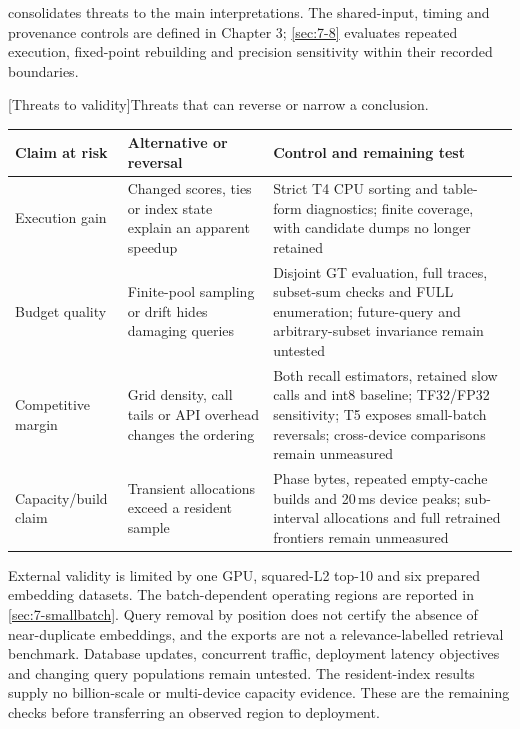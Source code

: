 consolidates threats to the main interpretations.
The shared-input, timing and provenance controls are defined in Chapter 3;
\cref{sec:7-8} evaluates repeated execution, fixed-point rebuilding and
precision sensitivity within their recorded boundaries.


\par\medskip\noindent\begin{minipage}{\linewidth}
\centering\captionsetup{hypcap=false}
[Threats to validity]{Threats that can reverse or narrow a conclusion.}
\label{tab:8-threats}
\footnotesize\setlength{\tabcolsep}{4pt}
\begin{tabularx}{\linewidth}{@{}*{3}{>{\raggedright\arraybackslash}X}@{}}
\toprule
Claim at risk & Alternative or reversal & Control and remaining test \\
\midrule
Execution gain & Changed scores, ties or index state explain an apparent
speedup & Strict T4 CPU sorting and table-form diagnostics; finite
coverage, with candidate dumps no longer retained \\
Budget quality & Finite-pool sampling or drift hides damaging queries
& Disjoint GT evaluation, full traces, subset-sum checks and FULL
enumeration; future-query and arbitrary-subset invariance remain untested \\
Competitive margin & Grid density, call tails or API overhead changes
the ordering & Both recall estimators, retained slow calls and int8
baseline; TF32/FP32 sensitivity; T5 exposes small-batch reversals;
cross-device comparisons remain unmeasured \\
Capacity/build claim & Transient allocations exceed a resident sample
& Phase bytes, repeated empty-cache builds and 20\,ms device peaks;
sub-interval allocations and full retrained frontiers remain unmeasured \\
\bottomrule
\end{tabularx}
\end{minipage}\par\medskip

External validity is limited by one GPU, squared-L2 top-10 and six
prepared embedding datasets. The batch-dependent operating regions are
reported in \cref{sec:7-smallbatch}. Query removal by position does not
certify the absence of near-duplicate embeddings, and the exports are not
a relevance-labelled retrieval benchmark. Database updates, concurrent
traffic, deployment latency objectives and changing query populations
remain untested. The resident-index results supply no billion-scale or
multi-device capacity evidence. These are the remaining checks before
transferring an observed region to deployment.
